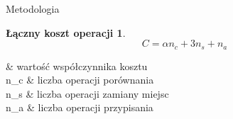 \begin{frame}[squeeze]{Metodologia}

	\newtheorem*{methodology*}{Łączny koszt operacji}
	\begin{methodology*}
		$$C = \alpha n_c + 3n_s + n_a $$
	\end{methodology*}

	\begin{conditions}
		\alpha	&  wartość współczynnika kosztu 	\\
		n_c		&  liczba operacji porównania 		\\   
		n_s		&  liczba operacji zamiany miejsc 	\\
		n_a		&  liczba operacji przypisania		\\
	\end{conditions}

\end{frame}
